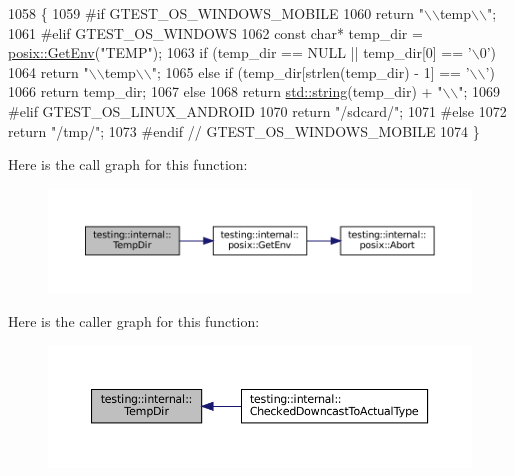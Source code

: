 \begin{DoxyCode}
1058                     \{
1059 \textcolor{preprocessor}{#if GTEST\_OS\_WINDOWS\_MOBILE}
1060   \textcolor{keywordflow}{return} \textcolor{stringliteral}{"\(\backslash\)\(\backslash\)temp\(\backslash\)\(\backslash\)"};
1061 \textcolor{preprocessor}{#elif GTEST\_OS\_WINDOWS}
1062   \textcolor{keyword}{const} \textcolor{keywordtype}{char}* temp\_dir = \hyperlink{namespacetesting_1_1internal_1_1posix_a1d5e3da5a27eed25986859fa83cafe95}{posix::GetEnv}(\textcolor{stringliteral}{"TEMP"});
1063   \textcolor{keywordflow}{if} (temp\_dir == NULL || temp\_dir[0] == \textcolor{charliteral}{'\(\backslash\)0'})
1064     \textcolor{keywordflow}{return} \textcolor{stringliteral}{"\(\backslash\)\(\backslash\)temp\(\backslash\)\(\backslash\)"};
1065   \textcolor{keywordflow}{else} \textcolor{keywordflow}{if} (temp\_dir[strlen(temp\_dir) - 1] == \textcolor{charliteral}{'\(\backslash\)\(\backslash\)'})
1066     \textcolor{keywordflow}{return} temp\_dir;
1067   \textcolor{keywordflow}{else}
1068     \textcolor{keywordflow}{return} \hyperlink{namespacetesting_1_1internal_a8e8ff5b11e64078831112677156cb111}{std::string}(temp\_dir) + \textcolor{stringliteral}{"\(\backslash\)\(\backslash\)"};
1069 \textcolor{preprocessor}{#elif GTEST\_OS\_LINUX\_ANDROID}
1070   \textcolor{keywordflow}{return} \textcolor{stringliteral}{"/sdcard/"};
1071 \textcolor{preprocessor}{#else}
1072   \textcolor{keywordflow}{return} \textcolor{stringliteral}{"/tmp/"};
1073 \textcolor{preprocessor}{#endif  // GTEST\_OS\_WINDOWS\_MOBILE}
1074 \}
\end{DoxyCode}
Here is the call graph for this function\+:
\nopagebreak
\begin{figure}[H]
\begin{center}
\leavevmode
\includegraphics[width=350pt]{namespacetesting_1_1internal_a59a959f437bd7d515b5c41dcf00229c9_cgraph}
\end{center}
\end{figure}
Here is the caller graph for this function\+:
\nopagebreak
\begin{figure}[H]
\begin{center}
\leavevmode
\includegraphics[width=350pt]{namespacetesting_1_1internal_a59a959f437bd7d515b5c41dcf00229c9_icgraph}
\end{center}
\end{figure}
